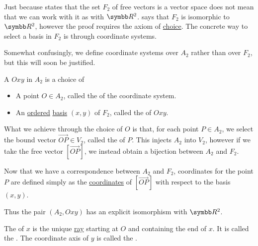 \begin{definition}\label{def:euclidean_plane_coordinate_system}
  Just because  states that the set \( F_2 \) of free vectors is a vector space does not mean that we can work with it as with \( \BR^2 \).  says that \( F_2 \) is isomorphic to \( \BR^2 \), however the proof requires the axiom of \hyperref[def:set_zfc/A9]{choice}. The concrete way to select a basis in \( F_2 \) is through coordinate systems.

  Somewhat confusingly, we define coordinate systems over \( A_2 \) rather than over \( F_2 \), but this will soon be justified.

  A  \( Oxy \) in \( A_2 \) is a choice of
  \begin{itemize}
    \item A point \( O \in A_2 \), called the  of the coordinate system.
    \item An \hyperref[def:poset]{ordered} \hyperref[def:left_module_hamel_basis]{basis} \( (x, y) \) of \( F_2 \), called the  of \( Oxy \).
  \end{itemize}

  What we achieve through the choice of \( O \) is that, for each point \( P \in A_2 \), we select the bound vector \( \Vec{OP} \in V_2 \), called the  of \( P \). This injects \( A_2 \) into \( V_2 \), however if we take the free vector \( [\Vec{OP}] \), we instead obtain a bijection between \( A_2 \) and \( F_2 \).

  Now that we have a correspondence between \( A_2 \) and \( F_2 \), coordinates for the point \( P \) are defined simply as the \hyperref[def:left_module_basis_projection]{coordinates} of \( [\Vec{OP}] \) with respect to the basis \( (x, y) \).

  Thus the pair \( (A_2, Oxy) \) has an explicit isomorphism with \( \BR^2 \).

  The  of \( x \) is the unique \hyperref[def:affine_plane/ray]{ray} starting at \( O \) and containing the end of \( x \). It is called the . The coordinate axis of \( y \) is called the .
\end{definition}

